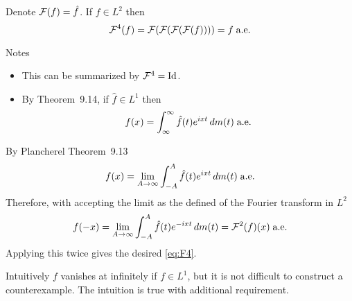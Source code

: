 \begin{llem}
Denote \(\mathcal{F}(f) = \hat{f}\).
If \(f\in L^2\) then
\begin{equation} \label{eq:F4}
\mathcal{F}^4(f) = \mathcal{F}(\mathcal{F}(\mathcal{F}(\mathcal{F}(f)))) = f \;\textrm{a.e.}
\end{equation}
\end{llem}
Notes
\begin{itemize}
\item This can be summarized by \(\mathcal{F}^4 = \mathop{\rm Id}\nolimits\).
\item By Theorem~9.14, if \(\hat{f}\in L^1\) then
\begin{equation*}
f(x) = \int_{\infty}^\infty \hat{f}(t) e^{ixt}\,dm(t)\;\textrm{a.e.}
\end{equation*}
\end{itemize}
\begin{thmproof}
By Plancherel Theorem~9.13
\begin{equation*}
f(x) = \lim_{A\to\infty}\int_{-A}^A \hat{f}(t) e^{ixt}\,dm(t) \;\textrm{a.e.}
\end{equation*}
Therefore, with
accepting the limit as the defined of the Fourier transform in \(L^2\) 
\begin{equation*}
f(-x) = \lim_{A\to\infty}\int_{-A}^A \hat{f}(t) e^{-ixt}\,dm(t) = \mathcal{F}^2(f)(x)
\;\textrm{a.e.}
\end{equation*}
Applying this twice gives the desired \eqref{eq:F4}.
\end{thmproof}

Intuitively $f$ vanishes at infinitely if \(f\in L^1\),
but it is not difficult to construct a counterexample.
The intuition is true with additional requirement.

